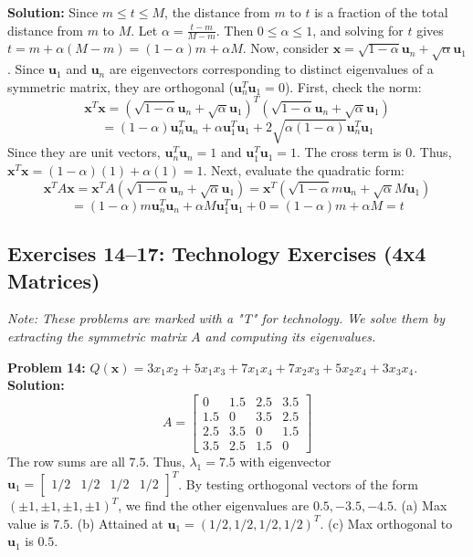 \documentclass[11pt, letterpaper]{article}
\theoremstyle{definition}
\theoremstyle{remark}
\begin{document}
\textbf{Solution:}
Since $m \le t \le M$, the distance from $m$ to $t$ is a fraction of the total distance from $m$ to $M$. Let $\alpha = \frac{t-m}{M-m}$. Then $0 \le \alpha \le 1$, and solving for $t$ gives $t = m + \alpha(M-m) = (1-\alpha)m + \alpha M$.
Now, consider $\mathbf{x} = \sqrt{1-\alpha}\mathbf{u}_n + \sqrt{\alpha}\mathbf{u}_1$. Since $\mathbf{u}_1$ and $\mathbf{u}_n$ are eigenvectors corresponding to distinct eigenvalues of a symmetric matrix, they are orthogonal ($\mathbf{u}_n^T \mathbf{u}_1 = 0$).
First, check the norm:
\[ \mathbf{x}^T\mathbf{x} = (\sqrt{1-\alpha}\mathbf{u}_n + \sqrt{\alpha}\mathbf{u}_1)^T (\sqrt{1-\alpha}\mathbf{u}_n + \sqrt{\alpha}\mathbf{u}_1) \]
\[ = (1-\alpha)\mathbf{u}_n^T\mathbf{u}_n + \alpha\mathbf{u}_1^T\mathbf{u}_1 + 2\sqrt{\alpha(1-\alpha)}\mathbf{u}_n^T\mathbf{u}_1 \]
Since they are unit vectors, $\mathbf{u}_n^T\mathbf{u}_n = 1$ and $\mathbf{u}_1^T\mathbf{u}_1 = 1$. The cross term is 0. Thus, $\mathbf{x}^T\mathbf{x} = (1-\alpha)(1) + \alpha(1) = 1$.
Next, evaluate the quadratic form:
\[ \mathbf{x}^T A \mathbf{x} = \mathbf{x}^T A (\sqrt{1-\alpha}\mathbf{u}_n + \sqrt{\alpha}\mathbf{u}_1) = \mathbf{x}^T (\sqrt{1-\alpha} m \mathbf{u}_n + \sqrt{\alpha} M \mathbf{u}_1) \]
\[ = (1-\alpha)m\mathbf{u}_n^T\mathbf{u}_n + \alpha M\mathbf{u}_1^T\mathbf{u}_1 + 0 = (1-\alpha)m + \alpha M = t \]

\subsection{Exercises 14--17: Technology Exercises (4x4 Matrices)}
\textit{Note: These problems are marked with a "T" for technology. We solve them by extracting the symmetric matrix $A$ and computing its eigenvalues.}

\textbf{Problem 14:} $Q(\mathbf{x}) = 3x_1x_2 + 5x_1x_3 + 7x_1x_4 + 7x_2x_3 + 5x_2x_4 + 3x_3x_4$.
\textbf{Solution:}
\[ A = \begin{bmatrix} 0 & 1.5 & 2.5 & 3.5 \\ 1.5 & 0 & 3.5 & 2.5 \\ 2.5 & 3.5 & 0 & 1.5 \\ 3.5 & 2.5 & 1.5 & 0 \end{bmatrix} \]
The row sums are all $7.5$. Thus, $\lambda_1 = 7.5$ with eigenvector $\mathbf{u}_1 = \begin{bmatrix} 1/2 & 1/2 & 1/2 & 1/2 \end{bmatrix}^T$.
By testing orthogonal vectors of the form $(\pm 1, \pm 1, \pm 1, \pm 1)^T$, we find the other eigenvalues are $0.5, -3.5, -4.5$.
(a) Max value is $7.5$. (b) Attained at $\mathbf{u}_1 = (1/2, 1/2, 1/2, 1/2)^T$. (c) Max orthogonal to $\mathbf{u}_1$ is $0.5$.
\end{document}
